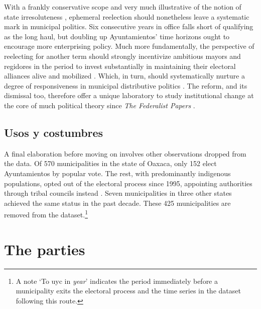 \documentclass[letter,12pt]{article}
\begin{document}
With a frankly conservative scope and very much illustrative of the notion of state irresoluteness \citep{cox.mccubbins.2001}, ephemeral reelection should nonetheless leave a systematic mark in municipal politics. Six consecutive years in office falls short of qualifying as the long haul, but doubling up Ayuntamientos' time horizons ought to encourage more enterprising policy. Much more fundamentally, the perspective of reelecting for another term should strongly incentivize ambitious mayors and regidores in the period to invest substantially in maintaining their electoral alliances alive and mobilized \citep{cain.etal.1987, motolinia-reel-pork2021}. Which, in turn, should systematically nurture a degree of responsiveness in municipal distributive politics \citep{cox.mccubbins.1986, jacobson.kernell.1983}. The reform, and its dismissal too, therefore offer a unique laboratory to study institutional change at the core of much political theory since \emph{The Federalist Papers} \citep{madison.etal.1788, mayhew.1974, schlesinger.1966, miller.hammond.1989}.

\subsection{Usos y costumbres}\label{S:uyc}

A final elaboration before moving on involves other observations dropped from the data. Of 570 municipalities in the state of Oaxaca, only 152 elect Ayuntamientos by popular vote. The rest, with predominantly indigenous populations, opted out of the electoral process since 1995, appointing authorities through tribal councils instead \citep[known as \emph{usos y costumbres} institutions, see][]{elizarraras.2002, eisenstadt.rios.uyc.2014}. Seven municipalities in three other states achieved the same status in the past decade. These 425 municipalities are removed from the dataset.\footnote{A note `To uyc in \emph{year}' indicates the period immediately before a municipality exits the electoral process and the time series in the dataset following this route.}

\section{The parties}
\end{document}
